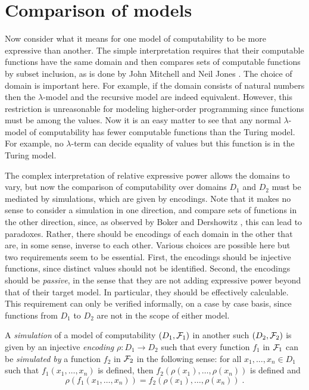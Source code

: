 \documentclass[a4paper]{article}
\begin{document}
\section{Comparison of models} 
\label{sec:equiv_models}

Now consider what it means for one model of computability to be more
expressive than another.  The simple interpretation requires that
their computable functions have the same domain and then compares sets
of computable functions by subset inclusion, as is done by John
Mitchell \cite{Mitchell92} and Neil Jones \cite{Jones97}.  The choice
of domain is important here. For example, if the domain consists of
natural numbers then the $\lambda$-model and the recursive model are indeed
equivalent.  However, this restriction is unreasonable for modeling
higher-order programming since functions must be among the values. Now
it is an easy matter to see that any normal $\lambda$-model of
computability has fewer computable functions than the Turing model.
For example, no $\lambda$-term can decide equality of values but this
function is in the Turing model.

The complex interpretation of relative expressive power allows the
domains to vary, but now the comparison of computability over domains
$D_1$ and $D_2$ must be mediated by simulations, which are given by
encodings.  Note that it makes no sense to consider a simulation in
one direction, and compare sets of functions in the other direction,
since, as observed by Boker and Dershowitz \cite{BokerD06}, this can
lead to paradoxes.  Rather, there should be encodings of each domain
in the other that are, in some sense, inverse to each other. Various
choices are possible here but two requirements seem to be essential.
First, the encodings should be injective functions, since distinct
values should not be identified.  Second, the encodings should be {\em
  passive}, in the sense that they are not adding expressive power
beyond that of their target model. In particular, they should be
effectively calculable.  This requirement can only be verified
informally, on a case by case basis, since functions from $D_1$ to
$D_2$ are not in the scope of either model.

A {\em simulation} of a model of computability $(D_1,{\cal F}_1)$ in another such
$(D_2, {\cal F}_2)$ is given by an injective {\em encoding} $\rho : D_1
\to D_2$ such that every function $f_1$ in ${\cal F}_1$ can be {\em
  simulated by} a function $f_2$ in ${\cal F}_2$ in the following sense:
for all $x_1,\ldots, x_n \in D_1$ such that $f_1(x_1,\ldots, x_n)$ is
defined, then $f_2(\rho(x_1),\ldots, \rho(x_n))$ is defined and
\[
\rho(f_1(x_1,\ldots, x_n)) = f_2(\rho(x_1),\ldots, \rho(x_n)) \; . 
\]
\end{document}
